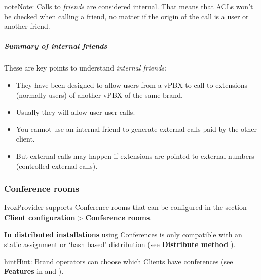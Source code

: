 \documentclass[letterpaper,10pt,english]{sphinxmanual}
\begin{document}
\begin{notice}{note}{Note:}
Calls to \emph{friends} are considered internal. That means that ACLs won't
be checked when calling a friend, no matter if the origin of the call
is a user or another friend.
\end{notice}


\subparagraph{Summary of internal friends}
\label{administration_portal/client/vpbx/routing_endpoints/friends/internal_friends:summary-of-internal-friends}
These are key points to understand \emph{internal friends}:
\begin{itemize}
\item {} 
They have been designed to allow users from a vPBX to call to extensions (normally users)
of another vPBX of the same brand.

\item {} 
Usually they will allow user-user calls.

\item {} 
You cannot use an internal friend to generate external calls paid by the other client.

\item {} 
But external calls may happen if extensions are pointed to external numbers (controlled external calls).

\end{itemize}


\subsubsection{Conference rooms}
\label{administration_portal/client/vpbx/routing_endpoints/conference_rooms::doc}\label{administration_portal/client/vpbx/routing_endpoints/conference_rooms:conference-rooms}\label{administration_portal/client/vpbx/routing_endpoints/conference_rooms:id1}
IvozProvider supports Conference rooms that can be configured in the section
\textbf{Client configuration} \textgreater{} \textbf{Conference rooms}.

\textbf{In distributed installations} using Conferences is only compatible with an static
assignment or `hash based' distribution (see \textbf{Distribute method} {\hyperref[administration_portal/brand/clients/virtual_pbx:virtual\string-pbx]{}}).

\begin{notice}{hint}{Hint:}
Brand operators can choose which Clients have conferences (see \textbf{Features}
in {\hyperref[getting_started/internal_calls/brand_portal:brand\string-configuration]{}} and {\hyperref[getting_started/internal_calls/client_portal:client\string-configuration]{}}).
\end{notice}
\end{document}
